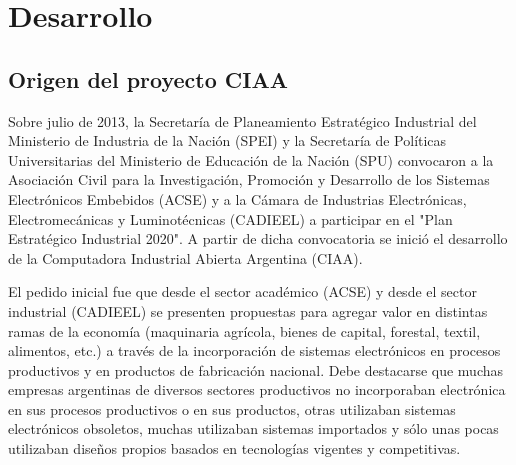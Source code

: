 \documentclass[12pt,letterpaper]{article}
\begin{document}


\section{Desarrollo}

\subsection{Origen del proyecto CIAA}
Sobre julio de 2013, la Secretaría de Planeamiento Estratégico Industrial del Ministerio de Industria de la Nación (SPEI) y la Secretaría de Políticas Universitarias del Ministerio de Educación de la Nación (SPU) convocaron a la Asociación Civil para la Investigación, Promoción y Desarrollo de los Sistemas Electrónicos Embebidos (ACSE) y a la Cámara de Industrias Electrónicas, Electromecánicas y Luminotécnicas (CADIEEL) a participar en el "Plan Estratégico Industrial 2020". A partir de dicha convocatoria se inició el desarrollo de la Computadora Industrial Abierta Argentina (CIAA).

El pedido inicial fue que desde el sector académico (ACSE) y desde el sector industrial (CADIEEL) se presenten propuestas para agregar valor en distintas ramas de la economía (maquinaria agrícola, bienes de capital, forestal, textil, alimentos, etc.) a través de la incorporación de sistemas electrónicos en procesos productivos y en productos de fabricación nacional. Debe destacarse que muchas empresas argentinas de diversos sectores productivos no incorporaban electrónica en sus procesos productivos o en sus productos, otras utilizaban sistemas electrónicos obsoletos, muchas utilizaban sistemas importados y sólo unas pocas utilizaban diseños propios basados en tecnologías vigentes y competitivas.
\end{document}
